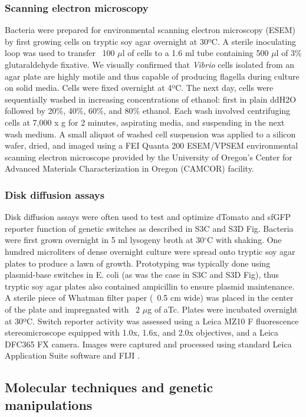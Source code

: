 {{{{{{{\subsubsection{Scanning electron microscopy} 
Bacteria were prepared for environmental scanning electron microscopy (ESEM) by first growing cells on tryptic soy agar overnight at 30ºC. A sterile inoculating loop was used to transfer ~100 $\mu$l of cells to a 1.6 ml tube containing 500 $\mu$l of 3\% glutaraldehyde fixative. We visually confirmed that \textit{Vibrio} cells isolated from an agar plate are highly motile and thus capable of producing flagella during culture on solid media. Cells were fixed overnight at 4ºC. The next day, cells were sequentially washed in increasing concentrations of ethanol: first in plain ddH2O followed by 20\%, 40\%, 60\%, and 80\% ethanol. Each wash involved centrifuging cells at 7,000 x g for 2 minutes, aspirating media, and suspending in the next wash medium. A small aliquot of washed cell suspension was applied to a silicon wafer, dried, and imaged using a FEI Quanta 200 ESEM/VPSEM environmental scanning electron microscope provided by the University of Oregon's Center for Advanced Materials Characterization in Oregon (CAMCOR) facility. 

\subsubsection{Disk diffusion assays}
Disk diffusion assays were often used to test and optimize dTomato and sfGFP reporter function of genetic switches as described in S3C and S3D Fig. Bacteria were first grown overnight in 5 ml lysogeny broth at 30$^\circ$C with shaking. One hundred microliters of dense overnight culture were spread onto tryptic soy agar plates to produce a lawn of growth. Prototyping was typically done using plasmid-base switches in E. coli (as was the case in S3C and S3D Fig), thus tryptic soy agar plates also contained ampicillin to ensure plasmid maintenance. A sterile piece of Whatman filter paper (~0.5 cm wide) was placed in the center of the plate and impregnated with ~2 $\mu$g of aTc. Plates were incubated overnight at 30ºC. Switch reporter activity was assessed using a Leica MZ10 F fluorescence stereomicroscope equipped with 1.0x, 1.6x, and 2.0x objectives, and a Leica DFC365 FX camera. Images were captured and processed using standard Leica Application Suite software and FIJI \cite{schindelin_fiji_2012}.   

\subsection{Molecular techniques and genetic manipulations}

}}}}}}}
